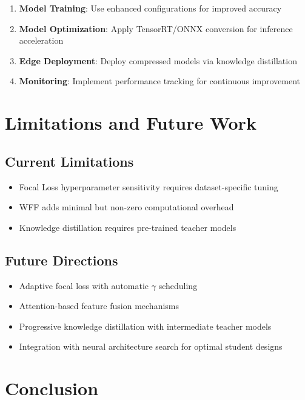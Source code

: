 \documentclass[journal]{IEEEtran}
\begin{document}
\begin{enumerate}
\item \textbf{Model Training}: Use enhanced configurations for improved accuracy
\item \textbf{Model Optimization}: Apply TensorRT/ONNX conversion for inference acceleration
\item \textbf{Edge Deployment}: Deploy compressed models via knowledge distillation
\item \textbf{Monitoring}: Implement performance tracking for continuous improvement
\end{enumerate}

\section{Limitations and Future Work}

\subsection{Current Limitations}

\begin{itemize}
\item Focal Loss hyperparameter sensitivity requires dataset-specific tuning
\item WFF adds minimal but non-zero computational overhead
\item Knowledge distillation requires pre-trained teacher models
\end{itemize}

\subsection{Future Directions}

\begin{itemize}
\item Adaptive focal loss with automatic $\gamma$ scheduling
\item Attention-based feature fusion mechanisms
\item Progressive knowledge distillation with intermediate teacher models
\item Integration with neural architecture search for optimal student designs
\end{itemize}

\section{Conclusion}
\end{document}
